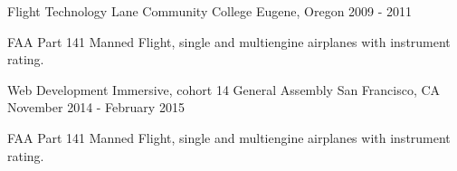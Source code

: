 

\begin{cventries}

  \cventry
    {Flight Technology} %
    {Lane Community College} %
    {Eugene, Oregon} %
    {2009 - 2011} %
    {
      \begin{cvitems} %
        \item {FAA Part 141 Manned Flight, single and multiengine airplanes with instrument rating.}
      \end{cvitems}
    }
  \cventry
    {Web Development Immersive, cohort 14} %
    {General Assembly} %
    {San Francisco, CA} %
    {November 2014 - February 2015} %
    {
      \begin{cvitems} %
        \item {FAA Part 141 Manned Flight, single and multiengine airplanes with instrument rating.}
      \end{cvitems}
    }
\end{cventries}
